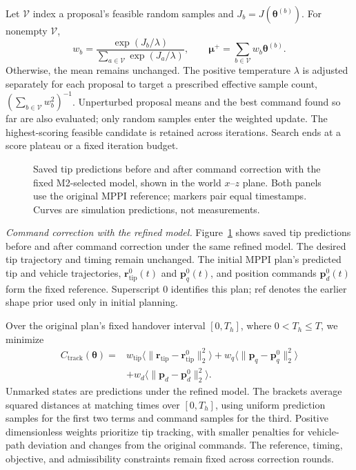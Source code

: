 \documentclass[letterpaper, 10 pt, conference]{ieeeconf}
\begin{document}
Let $\mathcal V$ index a proposal's feasible random samples and
$J_b=J(\boldsymbol\theta^{(b)})$. For nonempty $\mathcal V$,
\begin{equation}
w_b=\frac{\exp(J_b/\lambda)}{\sum_{a\in\mathcal V}\exp(J_a/\lambda)},
\qquad
\boldsymbol\mu^+=\sum_{b\in\mathcal V}w_b\boldsymbol\theta^{(b)}.
\label{eq:offline_sampling_update}
\end{equation}
Otherwise, the mean remains unchanged. The positive temperature
$\lambda$ is adjusted separately for each proposal to target a
prescribed effective sample count,
$(\sum_{b\in\mathcal V}w_b^2)^{-1}$.
Unperturbed proposal means and the best command found so far
are also evaluated; only random samples enter the weighted update.
The highest-scoring feasible candidate is retained across iterations.
Search ends at a score plateau or a fixed iteration budget.

\begin{figure}[t]
    \centering
    \resizebox{\columnwidth}{!}{}
    \caption{Saved tip predictions before and after command correction
    with the fixed M2-selected model, shown in the world $x$--$z$ plane.
    Both panels use the original MPPI reference; markers pair equal
    timestamps. Curves are simulation predictions, not measurements.}
    \label{fig:command_correction}
\end{figure}

\noindent\emph{Command correction with the refined model.}
Figure~\ref{fig:command_correction} shows saved tip predictions
before and after command correction under the same refined model.
The desired tip trajectory and timing remain unchanged. The initial MPPI
plan's predicted tip and vehicle trajectories,
$\mathbf r_{\mathrm{tip}}^0(t)$ and $\mathbf p_q^0(t)$,
and position commands $\mathbf p_d^0(t)$ form the fixed reference.
Superscript $0$ identifies this plan; $\mathrm{ref}$ denotes
the earlier shape prior used only in initial planning.

Over the original plan's fixed handover interval $[0,T_h]$,
where $0<T_h\leq T$, we minimize
\begin{equation}
\begin{aligned}
C_{\mathrm{track}}(\boldsymbol\theta)
={}&w_{\mathrm{tip}}\bigl\langle\|\mathbf r_{\mathrm{tip}}-\mathbf r_{\mathrm{tip}}^0\|_2^2\bigr\rangle
+w_q\bigl\langle\|\mathbf p_q-\mathbf p_q^0\|_2^2\bigr\rangle\\
&+w_d\bigl\langle\|\mathbf p_d-\mathbf p_d^0\|_2^2\bigr\rangle.
\end{aligned}
\label{eq:reference_tracking_cost}
\end{equation}
Unmarked states are predictions under the refined model.
The brackets average squared distances at matching times over
$[0,T_h]$, using uniform prediction samples for the first two
terms and command samples for the third. Positive dimensionless
weights prioritize tip tracking, with smaller penalties for
vehicle-path deviation and changes from the original commands.
The reference, timing, objective, and admissibility constraints
remain fixed across correction rounds.
\end{document}
